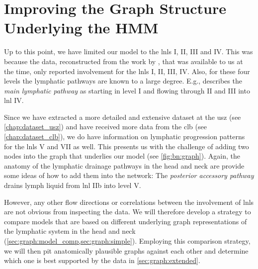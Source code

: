 \documentclass[\relativeRoot/main.tex]{subfiles}
\begin{document}
\chapter{Improving the Graph Structure Underlying the HMM}
\label{chap:graph}

Up to this point, we have limited our model to the \glspl{lnl} I, II, III and IV. This was because the data, reconstructed from the work by , that was available to us at the time, only reported involvement for the \glspl{lnl} I, II, III, IV. Also, for these four levels the lymphatic pathways are known to a large degree. E.g.,  describes the \emph{main lymphatic pathway} as starting in level I and flowing through II and III into \gls{lnl} IV.

Since we have extracted a more detailed and extensive dataset at the \gls{usz} (see \cref{chap:dataset_usz}) and have received more data from the \gls{clb} (see \cref{chap:dataset_clb}), we do have information on lymphatic progression patterns for the \glspl{lnl} V and VII as well. This presents us with the challenge of adding two nodes into the graph that underlies our model (see \cref{fig:bn:graph}). Again, the anatomy of the lymphatic drainage pathways in the head and neck are provide some ideas of how to add them into the network: The \emph{posterior accessory pathway} drains lymph liquid from \gls{lnl} IIb into level V.

However, any other flow directions or correlations between the involvement of \glspl{lnl} are not obvious from inspecting the data. We will therefore develop a strategy to compare models that are based on different underlying graph representations of the lymphatic system in the head and neck (\cref{sec:graph:model_comp,sec:graph:simple}). Employing this comparison strategy, we will then pit anatomically plausible graphs against each other and determine which one is best supported by the data in \cref{sec:graph:extended}.




\end{document}
